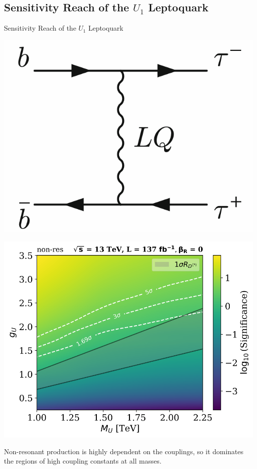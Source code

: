 \documentclass{../bredelebeamer}
\begin{document}
\subsection{Sensitivity Reach of the $U_1$ Leptoquark}
\begin{frame}{Sensitivity Reach of the $U_1$ Leptoquark}
	\begin{minipage}{.32\linewidth}
		\includegraphics[width=\linewidth]{../2023_paper/non_resonant.png}
	\end{minipage}
	\begin{minipage}{.66\linewidth}
		\includegraphics[width=\linewidth]{../2023_paper/Significance_Heatmap_13TeV_L137_non-res_combined_woRHC.pdf}
	\end{minipage}

	{\large
		  Non-resonant production is highly dependent on the couplings, so it dominates the regions of high coupling constants at all masses.
	}
\end{frame}
\end{document}
